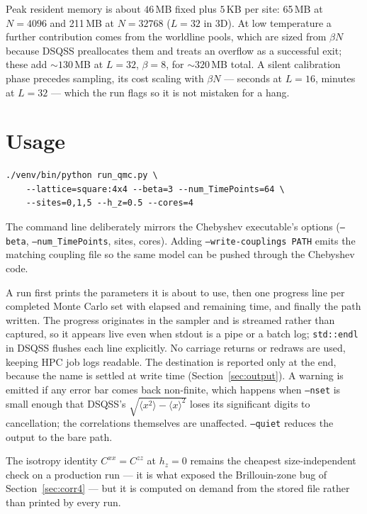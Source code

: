 \documentclass[11pt,a4paper]{article}
\newcommand{\code}[1]{\texttt{#1}}
\begin{document}
Peak resident memory is about $46\,$MB fixed plus $5\,$KB per site: 65\,MB at
$N=4096$ and 211\,MB at $N=32768$ ($L=32$ in 3D). At low temperature a further
contribution comes from the worldline pools, which are sized from $\beta N$
because DSQSS preallocates them and treats an overflow as a successful exit;
these add $\sim130\,$MB at $L=32$, $\beta=8$, for $\sim320\,$MB total. A silent
calibration phase precedes sampling, its cost scaling with $\beta N$ --- seconds
at $L=16$, minutes at $L=32$ --- which the run flags so it is not mistaken for a
hang.

\section{Usage}

\begin{lstlisting}
./venv/bin/python run_qmc.py \
    --lattice=square:4x4 --beta=3 --num_TimePoints=64 \
    --sites=0,1,5 --h_z=0.5 --cores=4
\end{lstlisting}

The command line deliberately mirrors the Chebyshev executable's options
(\code{--beta}, \code{--num\_TimePoints}, sites, cores). Adding
\code{--write-couplings PATH} emits the matching coupling file so the same model
can be pushed through the Chebyshev code.

A run first prints the parameters it is about to use, then one progress line per
completed Monte Carlo set with elapsed and remaining time, and finally the path
written. The progress originates in the sampler and is streamed rather than
captured, so it appears live even when stdout is a pipe or a batch log;
\code{std::endl} in DSQSS flushes each line explicitly. No carriage returns or
redraws are used, keeping HPC job logs readable. The destination is reported only
at the end, because the name is settled at write time
(Section~\ref{sec:output}). A warning is emitted if any error bar comes back
non-finite, which happens when \code{--nset} is small enough that DSQSS's
$\sqrt{\langle x^2\rangle-\langle x\rangle^2}$ loses its significant digits to
cancellation; the correlations themselves are unaffected. \code{--quiet} reduces
the output to the bare path.

The isotropy identity $C^{xx}=C^{zz}$ at $h_z=0$ remains the cheapest
size-independent check on a production run --- it is what exposed the
Brillouin-zone bug of Section~\ref{sec:corr4} --- but it is computed on demand
from the stored file rather than printed by every run.
\end{document}
